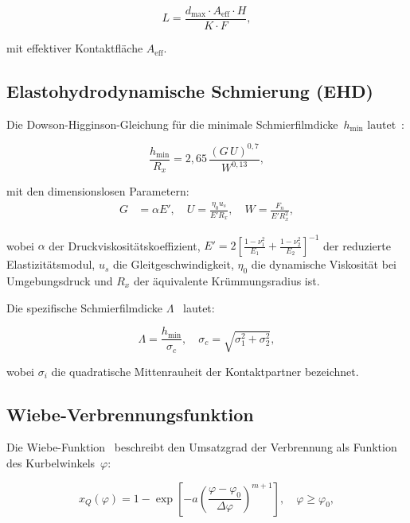 ﻿\documentclass[12pt,a4paper]{article}
\begin{document}
\begin{equation}
  L = \frac{d_{\max} \cdot A_{\mathrm{eff}} \cdot H}{K \cdot F},
  \label{eq:lebensdauer_archard}
\end{equation}

mit effektiver Kontaktfläche $A_{\mathrm{eff}}$.

\subsection{Elastohydrodynamische Schmierung (EHD)}
\label{sec:grundlagen_ehd}

Die Dowson-Higginson-Gleichung für die minimale Schmierfilmdicke~$h_{\min}$
lautet~\cite{dowson1977}:

\begin{equation}
  \frac{h_{\min}}{R_x} = 2{,}65\,
  \frac{(G\,U)^{0{,}7}}{W^{0{,}13}},
  \label{eq:dhg}
\end{equation}

mit den dimensionslosen Parametern:
\begin{align}
  G &= \alpha E', \quad
  U = \frac{\eta_0 u_s}{E' R_x}, \quad
  W = \frac{F_n}{E' R_x^2},
\end{align}

wobei $\alpha$ der Druckviskositätskoeffizient, $E' = 2\left[
\frac{1-\nu_1^2}{E_1} + \frac{1-\nu_2^2}{E_2}\right]^{-1}$ der
reduzierte Elastizitätsmodul, $u_s$ die Gleit\-geschwindigkeit,
$\eta_0$ die dynamische Viskosität bei Umgebungsdruck und $R_x$
der äquivalente Krümmungsradius ist.

Die spezifische Schmierfilmdicke $\Lambda$~\cite{hamrock1994} lautet:

\begin{equation}
  \Lambda = \frac{h_{\min}}{\sigma_c}, \quad
  \sigma_c = \sqrt{\sigma_1^2 + \sigma_2^2},
  \label{eq:lambda}
\end{equation}

wobei $\sigma_i$ die quadratische Mittenrauheit der Kontaktpartner bezeichnet.

\subsection{Wiebe-Verbrennungsfunktion}
\label{sec:grundlagen_wiebe}

Die Wiebe-Funktion~\cite{wiebe1970} beschreibt den Umsatzgrad der
Verbrennung als Funktion des Kurbelwinkels~$\varphi$:

\begin{equation}
  x_Q(\varphi) = 1 - \exp\!\left[-a \left(\frac{\varphi - \varphi_0}{\Delta\varphi}\right)^{m+1}\right],
  \quad \varphi \geq \varphi_0,
  \label{eq:wiebe}
\end{equation}
\end{document}

